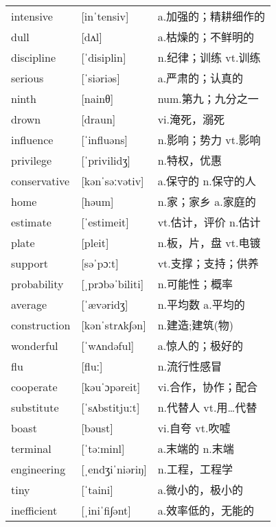 \documentclass[a4paper]{article}
\begin{document}
\section{}
\begin{tabular}{l l l}

intensive & [inˈtensiv] & a.加强的；精耕细作的 \\
dull & [dʌl] & a.枯燥的；不鲜明的 \\
discipline & [ˈdisiplin] & n.纪律；训练 vt.训练 \\
serious & [ˈsiəriəs] & a.严肃的；认真的 \\
ninth & [nainθ] & num.第九；九分之一 \\
drown & [draun] & vi.淹死，溺死 \\
influence & [ˈinfluəns] & n.影响；势力 vt.影响 \\
privilege & [ˈprivilidʒ] & n.特权，优惠 \\
conservative & [kənˈsəːvətiv] & a.保守的 n.保守的人 \\
home & [həum] & n.家；家乡 a.家庭的 \\
estimate & [ˈestimeit] & vt.估计，评价 n.估计 \\
plate & [pleit] & n.板，片，盘 vt.电镀 \\
support & [səˈpɔːt] & vt.支撑；支持；供养 \\
probability & [ˌprɔbəˈbiliti] & n.可能性；概率 \\
average & [ˈævəridʒ] & n.平均数 a.平均的 \\
construction & [kənˈstrʌk∫ən] & n.建造;建筑(物) \\
wonderful & [ˈwʌndəful] & a.惊人的；极好的 \\
flu & [fluː] & n.流行性感冒 \\
cooperate & [kəuˈɔpəreit] & vi.合作，协作；配合 \\
substitute & [ˈsʌbstitjuːt] & n.代替人 vt.用…代替 \\
boast & [bəust] & vi.自夸 vt.吹嘘 \\
terminal & [ˈtəːminl] & a.末端的 n.末端 \\
engineering & [ˌendʒiˈniəriŋ] & n.工程，工程学 \\
tiny & [ˈtaini] & a.微小的，极小的 \\
inefficient & [ˌiniˈfi∫ənt] & a.效率低的，无能的 \\

\end{tabular}
\end{document}
